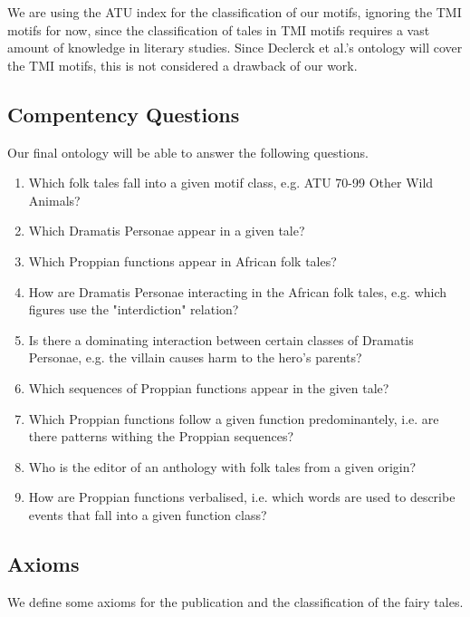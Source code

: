 \documentclass[10pt,a4paper]{article}
\begin{document}
We are using the ATU index for the classification of our motifs, ignoring the TMI motifs for now, since the classification of tales in TMI motifs requires a vast amount of  knowledge in literary studies. Since Declerck et al.'s ontology will cover the TMI motifs, this is not considered a drawback of our work. 

	 \subsection{Compentency Questions}
	 Our final ontology will be able to answer the following questions. 
	 
	 	\begin{enumerate}
	 		\item Which folk tales fall into a given motif class, e.g. ATU 70-99 Other Wild Animals? 
	 		\item Which Dramatis Personae appear in a given tale? 
	 		\item Which Proppian functions appear in African folk tales? 
	 		\item How are Dramatis Personae interacting in the African folk tales, e.g. which figures use the "interdiction" relation?
	 		\item Is there a dominating interaction between certain classes of Dramatis Personae, e.g. the villain causes harm to the hero's parents?
	 		\item Which sequences of Proppian functions appear in the given tale?
	 		\item Which Proppian functions follow a given function predominantely, i.e. are there patterns withing the Proppian sequences? 
	 		\item Who is the editor of an anthology with folk tales from a given origin?
	 		\item How are Proppian functions verbalised, i.e. which words are used to describe events that fall into a given function class? 
	 	\end{enumerate}


	\subsection{Axioms}
	\label{axes}
We define some axioms for the publication and the classification of the fairy tales. 
	\small 
\end{document}
